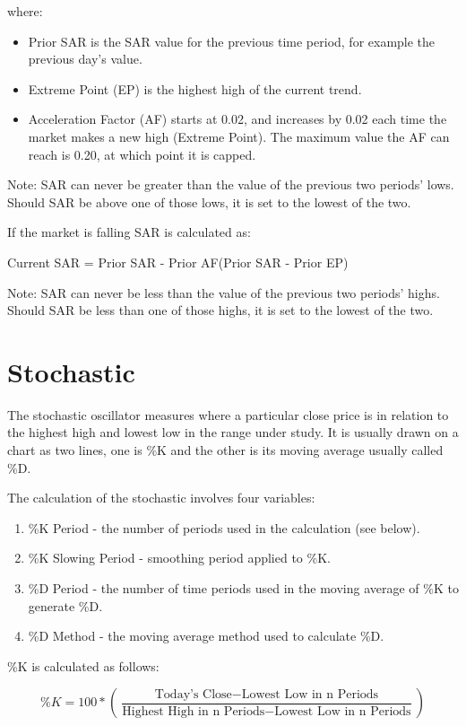 where:\\
\begin{itemize}
\item Prior SAR is the SAR value for the previous time period, for example the previous day's value.
\item Extreme Point (EP) is the highest high of the current trend.
\item Acceleration Factor (AF) starts at 0.02, and increases by 0.02 each time the market makes a new high (Extreme Point). The maximum value the AF can reach is 0.20, at which point it is capped.
\end{itemize}
Note:  SAR can never be greater than the value of the previous two periods' lows. Should SAR be above one of those lows, it is set to the lowest of the two.

If the market is falling SAR is calculated as:
\begin{center}
Current SAR = Prior SAR - Prior AF(Prior SAR - Prior EP)
\end{center}
Note:  SAR can never be less than the value of the previous two periods' highs. Should SAR be less than one of those highs, it is set to the lowest of the two.

\section{Stochastic}
\label{appB:stoch}
The stochastic oscillator measures where a particular close price is in relation to the highest high and lowest low in the range under study. It is usually drawn on a chart as two lines, one is \%K and the other is its moving average usually called \%D.

The calculation of the stochastic involves four variables:
\begin{enumerate}
\item \%K Period - the number of periods used in the calculation (see below).
\item \%K Slowing Period - smoothing period applied to \%K.
\item \%D Period - the number of time periods used in the moving average of \%K to generate \%D.
\item \%D Method - the moving average method used to calculate \%D.
\end{enumerate}

\%K is calculated as follows: 

\[ \%K = 100 * \left( \dfrac{\text{Today's Close} - \text{Lowest Low in n Periods}}{\text{Highest High in n Periods} - \text{Lowest Low in n Periods}} \right) \]

